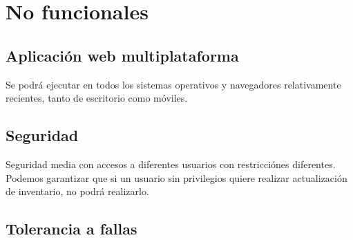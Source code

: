 \documentclass[12pt, fleqn]{report}                             %
\theoremstyle{break}                                            %
\begin{document}
    
    
    
    \section{No funcionales}
    
        
            
        
        

        \subsection{Aplicación web multiplataforma}
        
            Se podrá ejecutar en todos los sistemas operativos y navegadores relativamente recientes, tanto de escritorio como móviles.
        
        \subsection{Seguridad}
        
            Seguridad media con accesos a diferentes usuarios con restricciónes diferentes.
            Podemos garantizar que si un usuario sin privilegios quiere realizar actualización de inventario, no podrá realizarlo.
        
        
        \subsection{Tolerancia a fallas}
        
\end{document}
